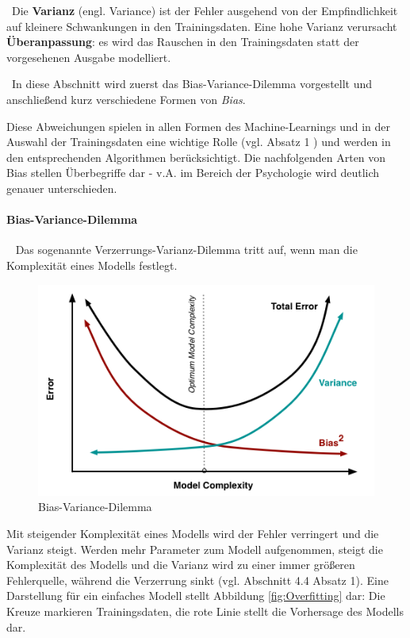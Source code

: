 ~\newline Die \textbf{Varianz} (engl. Variance) ist der Fehler ausgehend von der Empfindlichkeit auf kleinere Schwankungen in den Trainingsdaten. Eine hohe Varianz verursacht \textbf{Überanpassung}: es wird das Rauschen in den Trainingsdaten statt der vorgesehenen Ausgabe modelliert.


~\newline In diese Abschnitt wird zuerst das Bias-Variance-Dilemma vorgestellt und anschließend kurz verschiedene Formen von \textit{Bias}. 

Diese Abweichungen spielen in allen Formen des Machine-Learnings und in der Auswahl der Trainingsdaten eine wichtige Rolle (vgl. \cite{BiasTypes} Absatz 1 ) und werden in den entsprechenden Algorithmen berücksichtigt. Die nachfolgenden Arten von Bias stellen Überbegriffe dar - v.A. im Bereich der Psychologie wird deutlich genauer unterschieden.
\paragraph{Bias-Variance-Dilemma} ~\newline
Das sogenannte Verzerrungs-Varianz-Dilemma tritt auf, wenn man die Komplexität eines Modells festlegt.
\begin{figure}[h]
	\begin{center}
		\includegraphics[width=0.6\linewidth]{Bilder/BiasVariance}
		\caption[Bias-Variance-Dilemma: \url{
			http://scott.fortmann-roe.com/docs/BiasVariance.html}]{Bias-Variance-Dilemma}
		\label{fig:BVDilemma}
	\end{center}
\end{figure}
Mit steigender Komplexität eines Modells wird der Fehler verringert und die Varianz steigt. Werden mehr Parameter zum Modell aufgenommen, steigt die Komplexität des Modells und die Varianz wird zu einer immer größeren Fehlerquelle, während die Verzerrung sinkt (vgl. \cite{BiasVarianceDilemma} Abschnitt 4.4 Absatz 1). Eine Darstellung für ein einfaches Modell stellt Abbildung \ref{fig:Overfitting} dar: Die Kreuze markieren Trainingsdaten, die rote Linie stellt die Vorhersage des Modells dar. 

